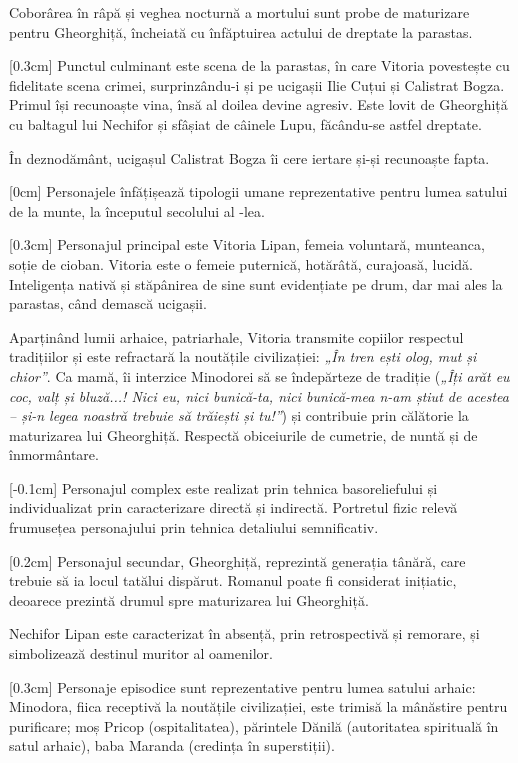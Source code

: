 Coborârea în râpă și veghea nocturnă a mortului sunt probe de maturizare pentru Gheorghiță, încheiată cu înfăptuirea actului de dreptate la parastas.

[0.3cm]
Punctul culminant este scena de la parastas, în care Vitoria povestește cu fidelitate scena crimei, surprinzându-i și pe ucigașii Ilie Cuțui și Calistrat Bogza. Primul își recunoaște vina, însă al doilea devine agresiv. Este lovit de Gheorghiță cu baltagul lui Nechifor și sfâșiat de câinele Lupu, făcându-se astfel dreptate.

În deznodământ, ucigașul Calistrat Bogza îi cere iertare și-și recunoaște fapta.

[0cm]
Personajele înfățișează tipologii umane reprezentative pentru lumea satului de la munte, la începutul secolului al -lea.

[0.3cm]
Personajul principal este Vitoria Lipan, femeia voluntară, munteanca, soție de cioban. Vitoria este o femeie puternică, hotărâtă, curajoasă, lucidă. Inteligența nativă și stăpânirea de sine sunt evidențiate pe drum, dar mai ales la parastas, când demască ucigașii.

Aparținând lumii arhaice, patriarhale, Vitoria transmite copiilor respectul tradițiilor și este refractară la noutățile civilizației: \textit{„În tren ești olog, mut și chior”}. Ca mamă, îi interzice Minodorei să se îndepărteze de tradiție (\textit{„Îți arăt eu coc, valț și bluză...! Nici eu, nici bunică-ta, nici bunică-mea n-am știut de acestea -- și-n legea noastră trebuie să trăiești și tu!”}) și contribuie prin călătorie la maturizarea lui Gheorghiță. Respectă obiceiurile de cumetrie, de nuntă și de înmormântare.

[-0.1cm]
Personajul complex este realizat prin tehnica basoreliefului și individualizat prin caracterizare directă și indirectă. Portretul fizic relevă frumusețea personajului prin tehnica detaliului semnificativ.

[0.2cm]
Personajul secundar, Gheorghiță, reprezintă generația tânără, care trebuie să ia locul tatălui dispărut. Romanul poate fi considerat inițiatic, deoarece prezintă drumul spre maturizarea lui Gheorghiță.

Nechifor Lipan este caracterizat în absență, prin retrospectivă și remorare, și simbolizează destinul muritor al oamenilor.

[0.3cm]
Personaje episodice sunt reprezentative pentru lumea satului arhaic: Minodora, fiica receptivă la noutățile civilizației, este trimisă la mânăstire pentru purificare; moș Pricop (ospitalitatea), părintele Dănilă (autoritatea spirituală în satul arhaic), baba Maranda (credința în superstiții).

